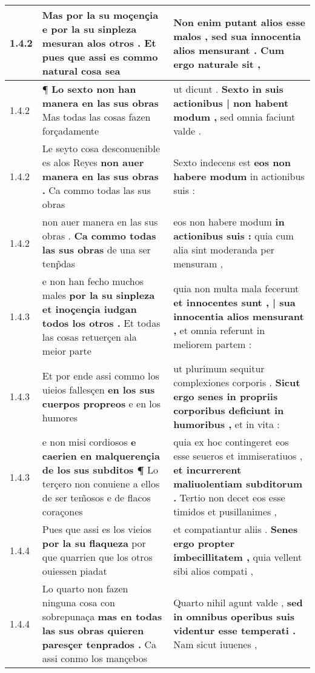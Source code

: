 \begin{tabular}{|p{1cm}|p{6.5cm}|p{6.5cm}|}
1.4.2 & Mas por la su moçençia \textbf{ e por la su sinpleza mesuran alos otros . } Et pues que assi es commo natural cosa sea & Non enim putant alios esse malos , \textbf{ sed sua innocentia alios mensurant . } Cum ergo naturale sit , \\\hline
1.4.2 & ¶ \textbf{ Lo sexto non han manera en las sus obras } Mas todas las cosas fazen forçadamente & ut dicunt . \textbf{ Sexto in suis actionibus | non habent modum , } sed omnia faciunt valde . \\\hline
1.4.2 & Le seyto cosa desconuenible es alos Reyes \textbf{ non auer manera en las sus obras . } Ca commo todas las sus obras & Sexto indecens est \textbf{ eos non habere modum } in actionibus suis : \\\hline
1.4.2 & non auer manera en las sus obras . \textbf{ Ca commo todas las sus obras } de una ser tenp̃das & eos non habere modum \textbf{ in actionibus suis : } quia cum alia sint moderanda per mensuram , \\\hline
1.4.3 & e non han fecho muchos males \textbf{ por la su sinpleza et inoçençia iudgan todos los otros . } Et todas las cosas retuerçen ala meior parte & quia non multa mala fecerunt \textbf{ et innocentes sunt , | sua innocentia alios mensurant , } et omnia referunt in meliorem partem : \\\hline
1.4.3 & Et por ende assi commo los uieios fallesçen \textbf{ en los sus cuerpos propreos } e en los humores & ut plurimum sequitur complexiones corporis . \textbf{ Sicut ergo senes in propriis corporibus deficiunt in humoribus , } et in vita : \\\hline
1.4.3 & e non misi cordiosos \textbf{ e caerien en malquerençia de los sus subditos ¶ } Lo terçero non conuiene a ellos de ser tem̃osos e de flacos coraçones & quia ex hoc contingeret eos esse seueros et immiseratiuos , \textbf{ et incurrerent maliuolentiam subditorum . } Tertio non decet eos esse timidos et pusillanimes , \\\hline
1.4.4 & Pues que assi es los vieios \textbf{ por la su flaqueza } por que quarrien que los otros ouiessen piadat & et compatiantur aliis . \textbf{ Senes ergo propter imbecillitatem , } quia vellent sibi alios compati , \\\hline
1.4.4 & Lo quarto non fazen ninguna cosa con sobrepunaça \textbf{ mas en todas las sus obras quieren paresçer tenprados . } Ca assi conmo los mançebos & Quarto nihil agunt valde , \textbf{ sed in omnibus operibus suis videntur esse temperati . } Nam sicut iuuenes , \\\hline

\end{tabular}
